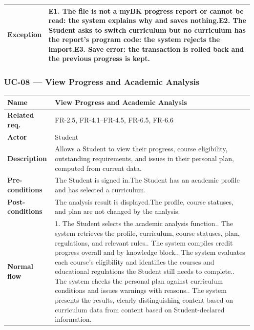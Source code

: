 \begin{longtable}{|p{}|p{}|}
\hline
\textbf{Exception} & E1. The file is not a myBK progress report or cannot be read: the system explains why and saves nothing.\newline E2. The Student asks to switch curriculum but no curriculum has the report's program code: the system rejects the import.\newline E3. Save error: the transaction is rolled back and the previous progress is kept. \\
\hline
\end{longtable}

\subsubsection{UC-08 --- View Progress and Academic Analysis}
\begin{longtable}{|p{}|p{}|}
\hline
\textbf{Name} & View Progress and Academic Analysis \\
\hline
\textbf{Related req.} & FR-2.5, FR-4.1--FR-4.5, FR-6.5, FR-6.6 \\
\hline
\textbf{Actor} & Student \\
\hline
\textbf{Description} & Allows a Student to view their progress, course eligibility, outstanding requirements, and issues in their personal plan, computed from current data. \\
\hline
\textbf{Pre-conditions} & The Student is signed in.\newline The Student has an academic profile and has selected a curriculum. \\
\hline
\textbf{Post-conditions} & The analysis result is displayed.\newline The profile, course statuses, and plan are not changed by the analysis. \\
\hline
\textbf{Normal flow} & 1. The Student selects the academic analysis function.\newline 2. The system retrieves the profile, curriculum, course statuses, plan, regulations, and relevant rules.\newline 3. The system compiles credit progress overall and by knowledge block.\newline 4. The system evaluates each course's eligibility and identifies the courses and educational regulations the Student still needs to complete.\newline 5. The system checks the personal plan against curriculum conditions and issues warnings with reasons.\newline 6. The system presents the results, clearly distinguishing content based on curriculum data from content based on Student-declared information. \\

\end{longtable}
